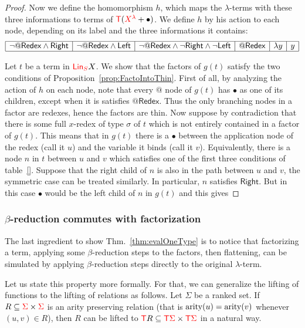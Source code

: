 \begin{proof}
Now we define the homomorphism $h$, which maps the $\lambda$-terms with these three informations to terms of ${\color{red}{\mathsf T}} ({\color{red}{X^\lambda}}+\bullet)$. We define $h$ by his action to each node, depending on its label and the three informations it contains:
$$\begin{array}{|l|l|l|l|l|l|}
\hline
\neg\mathsf{@Redex} \wedge \mathsf{Right} & \neg\mathsf{@Redex} \wedge \mathsf{Left} & \neg\mathsf{@Redex} \wedge \neg\mathsf{Right} \wedge \neg\mathsf{Left} & \mathsf{@Redex} &  \lambda y & y\\
\hline
\end{array}$$

Let $t$ be a term in ${\color{red}{\mathsf{Lin}_{S}}} X$. We show that the factors of $g(t)$ satisfy the two conditions of Proposition~\ref{prop:FactoIntoThin}. First of all, by analyzing the action of $h$ on each node, note that every $@$ node of $g(t)$ has $\bullet$ as one of its children, except when it is satisfies $\mathsf{@Redex}$. Thus the only branching nodes in a factor are redexes, hence the factors are thin. Now suppose by contradiction that there is some full $x$-redex of type $\sigma$ of $t$ which is not entirely contained in a factor of $g(t)$. This means that in $g(t)$ there is a $\bullet$ between the application node of the redex (call it $u$) and the variable it binds (call it $v$). Equivalently, there is a node $n$ in $t$ between $u$ and $v$ which satisfies one of the first three conditions of table~\ref{}.  Suppose that the right child of $n$ is also in the path between $u$ and $v$, the symmetric case can be treated similarly. In particular, $n$ satisfies $\mathsf{Right}$. But in this case $\bullet$ would be the left child of $n$ in $g(t)$ and this gives 
\end{proof}
\subsubsection{$\beta$-reduction commutes with factorization} \label{subsub:commutes}
The last ingredient to show Thm.~\ref{thm:evalOneType} is to notice  that factorizing a term, applying some $\beta$-reduction steps to the factors, then flattening, can be simulated by applying  $\beta$-reduction steps directly to the original $\lambda$-term.

Let us state this property more formally. For that, we can generalize the lifting of functions to the lifting of relations as follows. 
Let $\Sigma$ be a ranked set. If $R\subseteq {\color{red}{\Sigma}}\times{\color{red}{\Sigma}}$ is an arity preserving relation (that is $\mathrm{arity}(u)=\mathrm{arity}(v)$ whenever $(u,v)\in R$), then $R$ can be lifted to ${\color{red}{\mathsf T}} R\subseteq {\color{red}{{\color{red}{\mathsf T}}\Sigma}} \times {\color{red}{{\color{red}{\mathsf T}}\Sigma}}$ in a natural way. 

